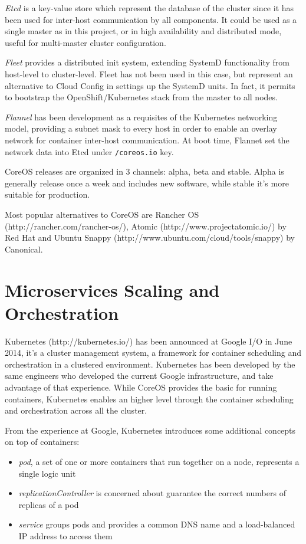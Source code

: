 \textit{Etcd} is a key-value store which represent the database of the cluster since it has been used for inter-host communication by all components.  It could be used as a single master as in this project, or in high availability and distributed mode, useful for multi-master cluster configuration.

\textit{Fleet} provides a distributed init system, extending SystemD functionality from host-level to cluster-level.  Fleet has not been used in this case, but represent an alternative to Cloud Config in settings up the SystemD units.  In fact, it permits to bootstrap the OpenShift/Kubernetes stack from the master to all nodes.

\textit{Flannel} has been development as a requisites of the Kubernetes networking model, providing a subnet mask to every host in order to enable an overlay network for container inter-host communication.  At boot time, Flannet set the network data into Etcd under \texttt{/coreos.io} key.

CoreOS releases are organized in 3 channels: alpha, beta and stable. Alpha is generally release once a week and includes new software, while stable it's more suitable for production.

Most popular alternatives to CoreOS are Rancher OS (http://rancher.com/rancher-os/), Atomic (http://www.projectatomic.io/) by Red Hat and Ubuntu Snappy (http://www.ubuntu.com/cloud/tools/snappy) by Canonical.

\section{Microservices Scaling and
Orchestration}\label{microservices-scaling-and-orchestration}

Kubernetes (http://kubernetes.io/) has been announced at Google I/O in June 2014, it's a cluster management system, a framework for container scheduling and orchestration in a clustered environment. Kubernetes has been developed by the same engineers who developed the current Google infrastructure, and take advantage of that experience.  While CoreOS provides the basic for running containers, Kubernetes enables an higher level through the container scheduling and orchestration across all the cluster.

From the experience at Google, Kubernetes introduces some additional concepts on top of containers:
\begin{itemize}
\item \textit{pod}, a set of one or more containers that run together on a node, represents a single logic unit
\item \textit{replicationController} is concerned about guarantee the correct numbers of replicas of a pod
\item \textit{service} groups pods and provides a common DNS name and a load-balanced IP address to access them
\end{itemize}


